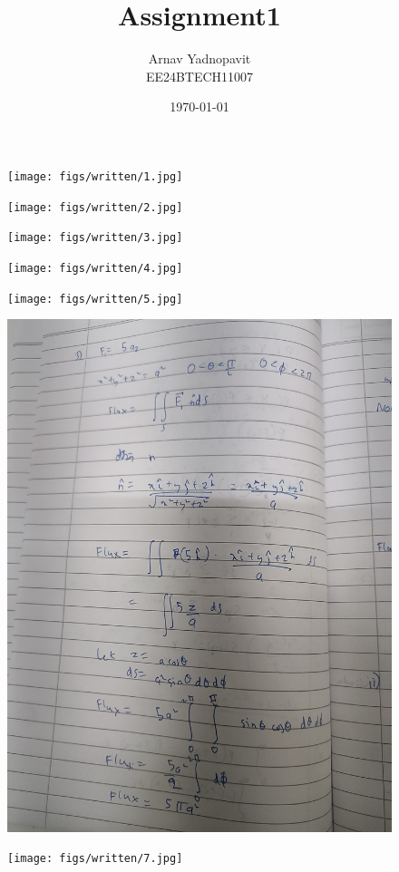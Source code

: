 \documentclass{article}
\title{Assignment1}
\author{Arnav Yadnopavit\\EE24BTECH11007}
\date{\today}
\begin{document}
\maketitle
\begin{figure}[H]
    \centering
    \texttt{[image: figs/written/1.jpg]}
\end{figure}
\begin{figure}[H]
    \centering
    \texttt{[image: figs/written/2.jpg]}
\end{figure}
\begin{figure}[H]
    \centering
    \texttt{[image: figs/written/3.jpg]}
\end{figure}
\begin{figure}[H]
    \centering
    \texttt{[image: figs/written/4.jpg]}
\end{figure}
\begin{figure}[H]
    \centering
    \texttt{[image: figs/written/5.jpg]}
\end{figure}
\begin{figure}[H]
    \centering
    \includegraphics[width=\textwidth]{figs/written/6.jpg}
\end{figure}
\begin{figure}[H]
    \centering
    \texttt{[image: figs/written/7.jpg]}
\end{figure}
\end{document}

